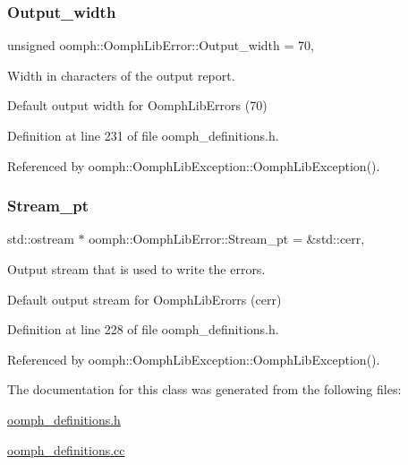 \subsubsection{\texorpdfstring{Output\+\_\+width}{Output\_width}}
{\footnotesize\ttfamily unsigned oomph\+::\+Oomph\+Lib\+Error\+::\+Output\+\_\+width = 70\hspace{0.3cm}{\ttfamily [static]}, {\ttfamily [private]}}



Width in characters of the output report. 

Default output width for Oomph\+Lib\+Errors (70) 

Definition at line 231 of file oomph\+\_\+definitions.\+h.



Referenced by oomph\+::\+Oomph\+Lib\+Exception\+::\+Oomph\+Lib\+Exception().

\mbox{\label{classoomph_1_1OomphLibError_a8a2076201ede98a0c72b94a713052b46}} 
\subsubsection{\texorpdfstring{Stream\+\_\+pt}{Stream\_pt}}
{\footnotesize\ttfamily std\+::ostream $\ast$ oomph\+::\+Oomph\+Lib\+Error\+::\+Stream\+\_\+pt = \&std\+::cerr\hspace{0.3cm}{\ttfamily [static]}, {\ttfamily [private]}}



Output stream that is used to write the errors. 

Default output stream for Oomph\+Lib\+Erorrs (cerr) 

Definition at line 228 of file oomph\+\_\+definitions.\+h.



Referenced by oomph\+::\+Oomph\+Lib\+Exception\+::\+Oomph\+Lib\+Exception().



The documentation for this class was generated from the following files\+:\begin{DoxyCompactItemize}
\item 
\hyperlink{oomph__definitions_8h}{oomph\+\_\+definitions.\+h}\item 
\hyperlink{oomph__definitions_8cc}{oomph\+\_\+definitions.\+cc}\end{DoxyCompactItemize}
